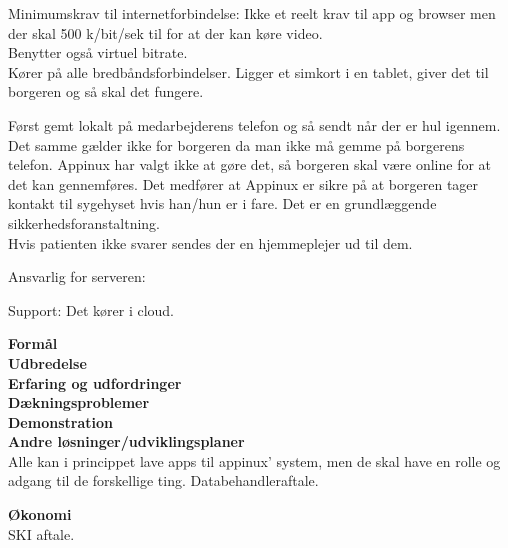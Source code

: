 Minimumskrav til internetforbindelse:
Ikke et reelt krav til app og browser men der skal 500 k/bit/sek til for at der kan køre video.\\
Benytter også virtuel bitrate. \\
Kører på alle bredbåndsforbindelser.
Ligger et simkort i en tablet, giver det til borgeren og så skal det fungere.

Først gemt lokalt på medarbejderens telefon og så sendt når der er hul igennem.\\
Det samme gælder ikke for borgeren da man ikke må gemme på borgerens telefon. 
Appinux har valgt ikke at gøre det, så borgeren skal være online for at det kan gennemføres. Det medfører at Appinux er sikre på at borgeren tager kontakt til sygehyset hvis han/hun er i fare. Det er en grundlæggende sikkerhedsforanstaltning.\\
Hvis patienten ikke svarer sendes der en hjemmeplejer ud til dem.



Ansvarlig for serveren:


Support:
Det kører i cloud.


\textbf{Formål} 
\\


\textbf{Udbredelse} 
\\


\textbf{Erfaring og udfordringer} 
\\


\textbf{Dækningsproblemer} 
\\


\textbf{Demonstration} 
\\


\textbf{Andre løsninger/udviklingsplaner} 
\\
Alle kan i princippet lave apps til appinux' system, men de skal have en rolle og adgang til de forskellige ting. Databehandleraftale.

\textbf{Økonomi} 
\\
SKI aftale.

